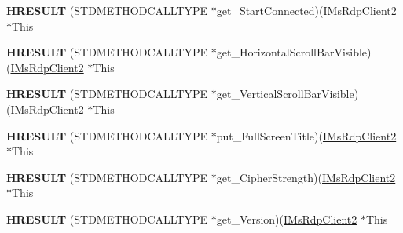 \begin{DoxyCompactItemize}
\item 
\mbox{\label{struct_m_s_t_s_c_lib_1_1_i_ms_rdp_client2_vtbl_ab5f87039db9fcee7c3acc8449b5d98b3}} 
{\bfseries H\+R\+E\+S\+U\+LT} (S\+T\+D\+M\+E\+T\+H\+O\+D\+C\+A\+L\+L\+T\+Y\+PE $\ast$get\+\_\+\+Start\+Connected)(\hyperlink{interface_m_s_t_s_c_lib_1_1_i_ms_rdp_client2}{I\+Ms\+Rdp\+Client2} $\ast$This
\item 
\mbox{\label{struct_m_s_t_s_c_lib_1_1_i_ms_rdp_client2_vtbl_a24fe7ff0833df38216072d41e2b6b50a}} 
{\bfseries H\+R\+E\+S\+U\+LT} (S\+T\+D\+M\+E\+T\+H\+O\+D\+C\+A\+L\+L\+T\+Y\+PE $\ast$get\+\_\+\+Horizontal\+Scroll\+Bar\+Visible)(\hyperlink{interface_m_s_t_s_c_lib_1_1_i_ms_rdp_client2}{I\+Ms\+Rdp\+Client2} $\ast$This
\item 
\mbox{\label{struct_m_s_t_s_c_lib_1_1_i_ms_rdp_client2_vtbl_a965b6205f83926811e8d3698f4c9095d}} 
{\bfseries H\+R\+E\+S\+U\+LT} (S\+T\+D\+M\+E\+T\+H\+O\+D\+C\+A\+L\+L\+T\+Y\+PE $\ast$get\+\_\+\+Vertical\+Scroll\+Bar\+Visible)(\hyperlink{interface_m_s_t_s_c_lib_1_1_i_ms_rdp_client2}{I\+Ms\+Rdp\+Client2} $\ast$This
\item 
\mbox{\label{struct_m_s_t_s_c_lib_1_1_i_ms_rdp_client2_vtbl_a09d7a0e7b2700cd6735af8930ff8d29a}} 
{\bfseries H\+R\+E\+S\+U\+LT} (S\+T\+D\+M\+E\+T\+H\+O\+D\+C\+A\+L\+L\+T\+Y\+PE $\ast$put\+\_\+\+Full\+Screen\+Title)(\hyperlink{interface_m_s_t_s_c_lib_1_1_i_ms_rdp_client2}{I\+Ms\+Rdp\+Client2} $\ast$This
\item 
\mbox{\label{struct_m_s_t_s_c_lib_1_1_i_ms_rdp_client2_vtbl_a20c843dbea27540782dba5146b0b0567}} 
{\bfseries H\+R\+E\+S\+U\+LT} (S\+T\+D\+M\+E\+T\+H\+O\+D\+C\+A\+L\+L\+T\+Y\+PE $\ast$get\+\_\+\+Cipher\+Strength)(\hyperlink{interface_m_s_t_s_c_lib_1_1_i_ms_rdp_client2}{I\+Ms\+Rdp\+Client2} $\ast$This
\item 
\mbox{\label{struct_m_s_t_s_c_lib_1_1_i_ms_rdp_client2_vtbl_af7bcb0610ccb34ab80a2c036140ab646}} 
{\bfseries H\+R\+E\+S\+U\+LT} (S\+T\+D\+M\+E\+T\+H\+O\+D\+C\+A\+L\+L\+T\+Y\+PE $\ast$get\+\_\+\+Version)(\hyperlink{interface_m_s_t_s_c_lib_1_1_i_ms_rdp_client2}{I\+Ms\+Rdp\+Client2} $\ast$This

\end{DoxyCompactItemize}
